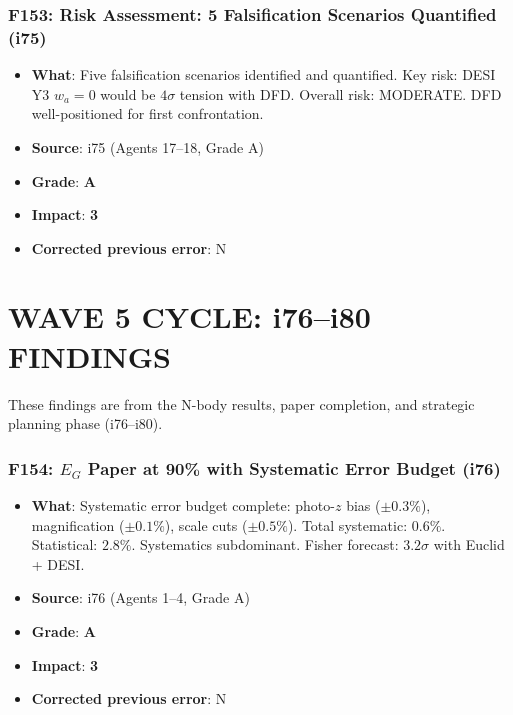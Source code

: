 \documentclass[11pt,a4paper]{article}
\newcommand{\grade}[1]{\textbf{#1}}
\newcommand{\impact}[1]{\textbf{#1}}
\begin{document}
\section{F153: Risk Assessment: 5 Falsification Scenarios Quantified (i75)}
\begin{itemize}[nosep]
\item \textbf{What}: Five falsification scenarios identified and quantified. Key risk: DESI Y3 $w_a = 0$ would be $4\sigma$ tension with DFD. Overall risk: MODERATE. DFD well-positioned for first confrontation.
\item \textbf{Source}: i75 (Agents 17--18, Grade A)
\item \textbf{Grade}: \grade{A}
\item \textbf{Impact}: \impact{3}
\item \textbf{Corrected previous error}: N
\end{itemize}


\part{WAVE 5 CYCLE: i76--i80 FINDINGS}
\label{part:wave5i76i80}

These findings are from the N-body results, paper completion, and strategic planning phase (i76--i80).

\section{F154: $E_G$ Paper at 90\% with Systematic Error Budget (i76)}
\begin{itemize}[nosep]
\item \textbf{What}: Systematic error budget complete: photo-$z$ bias ($\pm 0.3\%$), magnification ($\pm 0.1\%$), scale cuts ($\pm 0.5\%$). Total systematic: $0.6\%$. Statistical: $2.8\%$. Systematics subdominant. Fisher forecast: $3.2\sigma$ with Euclid + DESI.
\item \textbf{Source}: i76 (Agents 1--4, Grade A)
\item \textbf{Grade}: \grade{A}
\item \textbf{Impact}: \impact{3}
\item \textbf{Corrected previous error}: N
\end{itemize}
\end{document}
